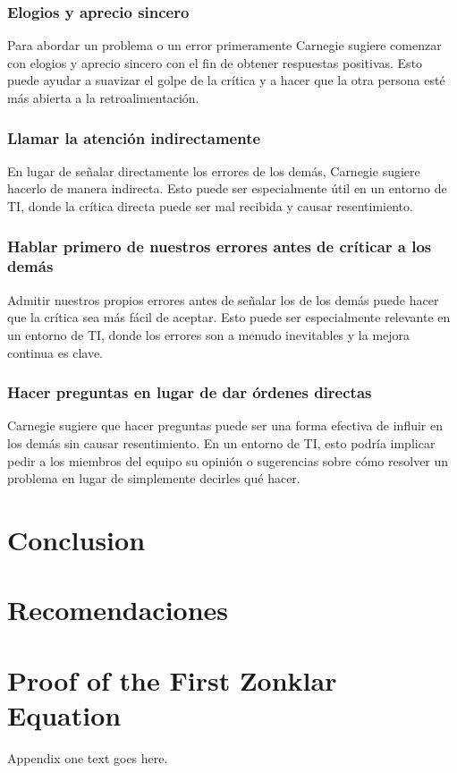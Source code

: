 \documentclass[journal]{IEEEtran}
\begin{document}
\subsubsection{Elogios y aprecio sincero}
Para abordar un problema o un error primeramente Carnegie sugiere comenzar con elogios y aprecio sincero con el fin de obtener respuestas positivas. Esto puede ayudar a suavizar el golpe de la crítica y a hacer que la otra persona esté más abierta a la retroalimentación.

\subsubsection{Llamar la atención indirectamente}
 En lugar de señalar directamente los errores de los demás, Carnegie sugiere hacerlo de manera indirecta. Esto puede ser especialmente útil en un entorno de TI, donde la crítica directa puede ser mal recibida y causar resentimiento.
 
 \subsubsection{Hablar primero de nuestros errores antes de críticar a los demás}
 Admitir nuestros propios errores antes de señalar los de los demás puede hacer que la crítica sea más fácil de aceptar. Esto puede ser especialmente relevante en un entorno de TI, donde los errores son a menudo inevitables y la mejora continua es clave.
 
 \subsubsection{Hacer preguntas en lugar de dar órdenes directas}
 Carnegie sugiere que hacer preguntas puede ser una forma efectiva de influir en los demás sin causar resentimiento. En un entorno de TI, esto podría implicar pedir a los miembros del equipo su opinión o sugerencias sobre cómo resolver un problema en lugar de simplemente decirles qué hacer.

\section{Conclusion}

\section{Recomendaciones}

\appendices
\section{Proof of the First Zonklar Equation}
Appendix one text goes here.
\end{document}
